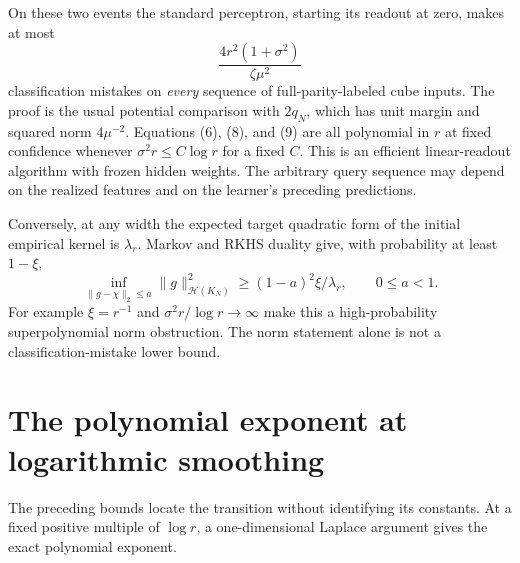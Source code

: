 \documentclass[11pt]{article}
\begin{document}
On these two events the standard perceptron, starting its readout at
zero, makes at most
\[
                  \frac{4r^2(1+\sigma^2)}{\zeta\mu^2}   \tag{9}
\]
classification mistakes on \emph{every} sequence of full-parity-labeled
cube inputs. The proof is the usual potential comparison with $2q_N$,
which has unit margin and squared norm $4\mu^{-2}$.
Equations (6), (8), and (9) are all polynomial in $r$ at fixed confidence
whenever $\sigma^2r\le C\log r$ for a fixed $C$.
This is an efficient linear-readout algorithm with frozen hidden weights.
The arbitrary query sequence may depend on the realized features and on
the learner's preceding predictions.

Conversely, at any width the expected target quadratic form of the
initial empirical kernel is $\lambda_r$. Markov and RKHS duality give,
with probability at least $1-\xi$,
\[
 \inf_{\|g-\chi\|_2\le a}\|g\|_{\mathcal H(K_N)}^2
                           \ge(1-a)^2\xi/\lambda_r,
 \qquad 0\le a<1.                                     \tag{10}
\]
For example $\xi=r^{-1}$ and $\sigma^2r/\log r\to\infty$
make this a high-probability superpolynomial norm obstruction.
The norm statement alone is not a classification-mistake lower bound.


\section{The polynomial exponent at logarithmic smoothing}
The preceding bounds locate the transition without identifying its
constants. At a fixed positive multiple of $\log r$, a one-dimensional
Laplace argument gives the exact polynomial exponent.
\end{document}
